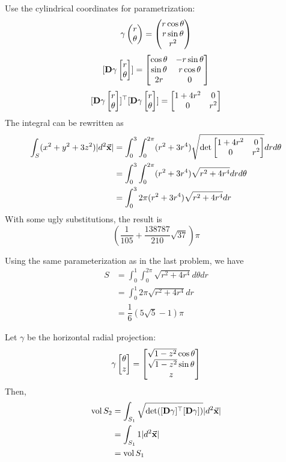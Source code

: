 \documentclass{homework}
\DeclareMathOperator{\vol}{vol}
\begin{document}
\begin{problem}{4}
Use the cylindrical coordinates for parametrization:
$$\gamma\begin{pmatrix}r\\\theta\end{pmatrix} = \begin{pmatrix}r\cos\theta\\r\sin\theta\\r^2\end{pmatrix}$$
$$[\mathbf{D}\gamma\begin{bmatrix}r\\\theta\end{bmatrix}]=
\begin{bmatrix}\cos\theta&-r\sin\theta\\
      \sin\theta& r\cos\theta\\
      2r        & 0\end{bmatrix}$$
$$[\mathbf{D}\gamma\begin{bmatrix}r\\\theta\end{bmatrix}]^{\top}[\mathbf{D}\gamma\begin{bmatrix}r\\\theta\end{bmatrix}]
=\begin{bmatrix}1+4r^2&0\\0&r^2\end{bmatrix}$$
The integral can be rewritten as
\begin{align*}
\int_S(x^2+y^2+3z^2) |d^2\vec{\mathbf{x}}|
&=
\int_0^3 \int_0^{2\pi}(r^2+3r^4)\sqrt{\det{\begin{bmatrix}1+4r^2&0\\0&r^2\end{bmatrix}}}drd\theta
\\ &=
\int_0^3 \int_0^{2\pi}(r^2+3r^4)\sqrt{r^2+4r^4}drd\theta
\\ &=
\int_0^3 2\pi(r^2+3r^4)\sqrt{r^2+4r^4}dr
\end{align*}
With some ugly substitutions, the result is
$$(\dfrac{1}{105}+\dfrac{138787}{210}\sqrt{37})\pi$$
\end{problem}

\begin{problem}{5}
Using the same parameterization as in the last problem, we have
\begin{align*}
S  &=
\int_0^1\int_0^{2\pi}\sqrt{r^2+4r^4}d\theta dr
\\ &=
\int_0^1 2\pi\sqrt{r^2+4r^4}dr
\\ &= \dfrac{1}{6}(5\sqrt{5}-1)\pi
\end{align*}
\end{problem}

\begin{problem}{6}
Let $\gamma$ be the horizontal radial projection:
$$\gamma\begin{bmatrix}\theta\\z\end{bmatrix}=\begin{bmatrix}
\sqrt{1-z^2}\cos\theta\\
\sqrt{1-z^2}\sin\theta\\
z\end{bmatrix}$$
Then,
\begin{align*}
\vol{S_2} &= \int_{S_1} \sqrt{\det([\mathbf{D}\gamma]^{\top}[\mathbf{D}\gamma])}
|d^2\bvec{x}| \\ &=
\int_{S_1} 1|d^2\bvec{x}| \\ &= \vol{S_1}
\end{align*}
\end{problem}
\end{document}
